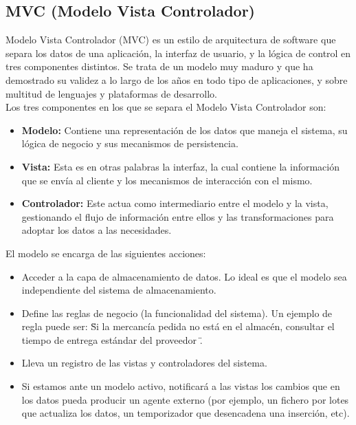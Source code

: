 		\subsection{MVC (Modelo Vista Controlador)}

			Modelo Vista Controlador (MVC) es un estilo de arquitectura de software que separa los datos de una aplicaci\'on, la interfaz de usuario, y la l\'ogica de control en tres componentes distintos. Se trata de un modelo muy maduro y que ha demostrado su validez a lo largo de los a\~nos en todo tipo de aplicaciones, y sobre multitud de lenguajes y plataformas de desarrollo. \\

			Los tres componentes en los que se separa el Modelo Vista Controlador son:
			\begin{itemize}
				\item \textbf{Modelo:} Contiene una representaci\'on de los datos que maneja el sistema, su l\'ogica de negocio y sus mecanismos de persistencia.
				\item \textbf{Vista:} Esta es en otras palabras la interfaz, la cual contiene la informaci\'on que se env\'ia al cliente y los mecanismos de interacci\'on con el mismo.
				\item \textbf{Controlador:} Este actua como intermediario entre el modelo y la vista, gestionando el flujo de informaci\'on entre ellos y las transformaciones para adoptar los datos a las necesidades.
			\end{itemize}

			El modelo se encarga de las siguientes acciones:
			\begin{itemize}
				\item Acceder a la capa de almacenamiento de datos. Lo ideal es que el modelo sea independiente del sistema de almacenamiento.
				\item Define las reglas de negocio (la funcionalidad del sistema). Un ejemplo de regla puede ser: \" Si la mercanc\'ia pedida no est\'a en el almac\'en, consultar el tiempo de entrega est\'andar del proveedor \".
				\item Lleva un registro de las vistas y controladores del sistema. 
				\item Si estamos ante un modelo activo, notificar\'a a las vistas los cambios que en los datos pueda producir un agente externo (por ejemplo, un fichero por lotes que actualiza los datos, un temporizador que desencadena una inserci\'on, etc).
			\end{itemize}

